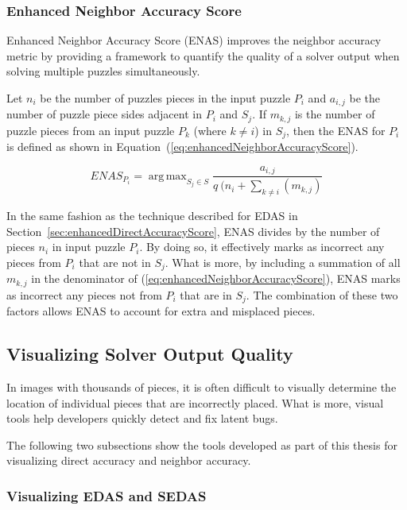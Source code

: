 \documentclass{report}
\def\eref#1{(\ref{#1})}
\DeclareMathOperator*{\argmax}{arg\,max} %
\begin{document}
\subsubsection{Enhanced Neighbor Accuracy Score}\label{sec:enhancedNeighborAccuracyScore}

Enhanced Neighbor Accuracy Score (ENAS) improves the neighbor accuracy metric by providing a framework to quantify the quality of a solver output when solving multiple puzzles simultaneously. 

Let $n_i$ be the number of puzzles pieces in the input puzzle $P_i$ and $a_{i,j}$ be the number of puzzle piece sides adjacent in $P_i$ and $S_j$.  If $m_{k,j}$ is the number of puzzle pieces from an input puzzle $P_k$ (where $k \ne i$) in $S_j$, then the ENAS for $P_i$ is defined as shown in Equation~\eref{eq:enhancedNeighborAccuracyScore}.

\begin{equation} \label{eq:enhancedNeighborAccuracyScore}
ENAS_{P_i} = \argmax_{S_j \in S}\frac{a_{i,j}}{q ~ (n_i + \sum_{k \ne i}(m_{k,j})}
\end{equation}

In the same fashion as the technique described for EDAS in Section~\ref{sec:enhancedDirectAccuracyScore}, ENAS divides by the number of pieces $n_i$ in input puzzle $P_i$.  By doing so, it effectively marks as incorrect any pieces from $P_i$ that are not in $S_j$.  What is more, by including a summation of all $m_{k,j}$ in the denominator of \eref{eq:enhancedNeighborAccuracyScore}, ENAS marks as incorrect any pieces not from $P_i$ that are in $S_j$.  The combination of these two factors allows ENAS to account for extra and misplaced pieces.

\subsection{Visualizing Solver Output Quality}\label{sec:visualizingSolverAccuracy}

In images with thousands of pieces, it is often difficult to visually determine the location of individual pieces that are incorrectly placed.  What is more, visual tools help developers quickly detect and fix latent bugs.

The following two subsections show the tools developed as part of this thesis for visualizing direct accuracy and neighbor accuracy.

\subsubsection{Visualizing EDAS and SEDAS}\label{sec:visualizingEdasSedas}
\end{document}
